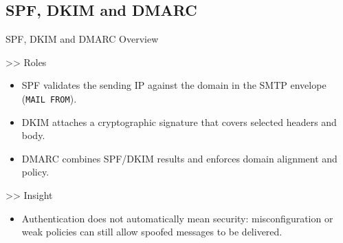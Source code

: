 \documentclass[aspectratio=169,10pt]{beamer}
\begin{document}
\subsection{SPF, DKIM and DMARC}
\begin{frame}{SPF, DKIM and DMARC Overview}
  \transdissolve
  \begin{block}{>> Roles} 
  \begin{itemize}
    \item SPF validates the sending IP against the domain in the SMTP envelope (\texttt{MAIL FROM}).
    \item DKIM attaches a cryptographic signature that covers selected headers and body.
    \item DMARC combines SPF/DKIM results and enforces domain alignment and policy. 
  \end{itemize} \vspace{10pt}
  \end{block}
  \vfill
  \begin{block}{>> Insight}
  \begin{itemize}
    \item Authentication does not automatically mean security: misconfiguration or weak policies can still allow spoofed messages to be delivered.
  \end{itemize} \vspace{10pt}
  \end{block}
\end{frame}
\end{document}
